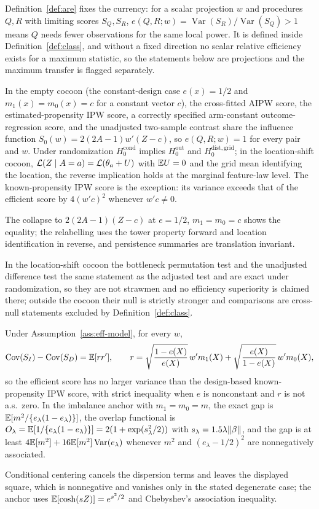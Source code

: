 Definition~\ref{def:are} fixes the currency: for a scalar projection $w$ and procedures $Q,R$ with limiting scores $S_Q,S_R$, $e(Q,R;w)=\operatorname{Var}(S_R)/\operatorname{Var}(S_Q)>1$ means $Q$ needs fewer observations for the same local power. It is defined inside Definition~\ref{def:class}, and without a fixed direction no scalar relative efficiency exists for a maximum statistic, so the statements below are projections and the maximum transfer is flagged separately.

\begin{theorem}
\label{thm:are-zero}
In the empty cocoon (the constant-design case $e(x)=1/2$ and $m_1(x)=m_0(x)=c$ for a constant vector $c$), the cross-fitted AIPW score, the estimated-propensity IPW score, a correctly specified arm-constant outcome-regression score, and the unadjusted two-sample contrast share the influence function $S_0(w)=2(2A-1)w'(Z-c)$, so $e(Q,R;w)=1$ for every pair and $w$. Under randomization $H_0^{\mathrm{cond}}$ implies $H_0^{\mathrm{out}}$ and $H_0^{\mathrm{dist,grid}}$; in the location-shift cocoon, $\mathcal{L}(Z\mid A=a)=\mathcal{L}(\theta_a+U)$ with $\mathbb{E} U=0$ and the grid mean identifying the location, the reverse implication holds at the marginal feature-law level. The known-propensity IPW score is the exception: its variance exceeds that of the efficient score by $4(w'c)^2$ whenever $w'c\ne0$.
\end{theorem}
The collapse to $2(2A-1)(Z-c)$ at $e=1/2$, $m_1=m_0=c$ shows the equality; the relabelling uses the tower property forward and location identification in reverse, and persistence summaries are translation invariant.

In the location-shift cocoon the bottleneck permutation test and the unadjusted difference test the same statement as the adjusted test and are exact under randomization, so they are not strawmen and no efficiency superiority is claimed there; outside the cocoon their null is strictly stronger and comparisons are cross-null statements excluded by Definition~\ref{def:class}.

\begin{theorem}
\label{thm:are-dominance}
Under Assumption~\ref{ass:eff-model}, for every $w$,
\[
\operatorname{Cov}(S_I)-\operatorname{Cov}(S_D)=\mathbb{E}[rr'],
\qquad
r=\sqrt{\frac{1-e(X)}{e(X)}}\,w'm_1(X)+\sqrt{\frac{e(X)}{1-e(X)}}\,w'm_0(X),
\]
so the efficient score has no larger variance than the design-based known-propensity IPW score, with strict inequality when $e$ is nonconstant and $r$ is not a.s.\ zero. In the imbalance anchor with $m_1=m_0=m$, the exact gap is $\mathbb{E}[m^2/\{e_\lambda(1-e_\lambda)\}]$, the overlap functional is $O_\lambda=\mathbb{E}[1/\{e_\lambda(1-e_\lambda)\}]=2(1+\exp(s_\lambda^2/2))$ with $s_\lambda=1.5\lambda\lVert \beta\rVert$, and the gap is at least $4\mathbb{E}[m^2]+16\mathbb{E}[m^2]\operatorname{Var}(e_\lambda)$ whenever $m^2$ and $(e_\lambda-1/2)^2$ are nonnegatively associated.
\end{theorem}
Conditional centering cancels the dispersion terms and leaves the displayed square, which is nonnegative and vanishes only in the stated degenerate case; the anchor uses $\mathbb{E}[\cosh(sZ)]=e^{s^2/2}$ and Chebyshev's association inequality.

